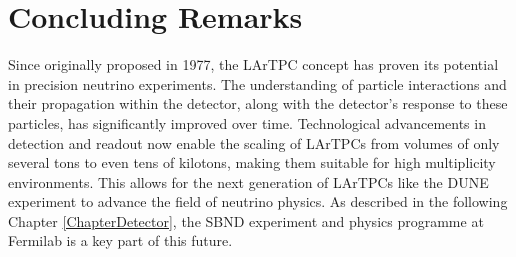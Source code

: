 \section{Concluding Remarks}
\label{lartpcConclude}
Since originally proposed in 1977, the LArTPC concept has proven its potential in precision neutrino experiments.
The understanding of particle interactions and their propagation within the detector, along with the detector's response to these particles, has significantly improved over time. 
Technological advancements in detection and readout now enable the scaling of LArTPCs from volumes of only several tons to even tens of kilotons, making them suitable for high multiplicity environments.
This allows for the next generation of LArTPCs like the DUNE experiment to advance the field of neutrino physics.
As described in the following Chapter \ref{ChapterDetector}, the SBND experiment and physics programme at Fermilab is a key part of this future.

